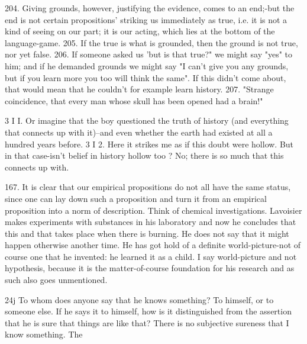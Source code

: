 204. Giving grounds, however, justifying the evidence, comes
to an end;-but the end is not certain propositions' striking us
immediately as true, i.e. it is not a kind of seeing on our part;
it is our acting, which lies at the bottom of the language-game.
205. If the true is what is grounded, then the ground is not
true, nor yet false.
206. If someone asked us 'but is that true?" we might say "yes"
to him; and if he demanded grounds we might say "I can't give
you any grounds, but if you learn more you too will think the
same".
If this didn't come about, that would mean that he couldn't
for example learn history.
207. "Strange coincidence, that every man whose skull has
been opened had a brain!"


3 I I. Or imagine that the boy questioned the truth of history
(and everything that connects up with it)--and even whether the
earth had existed at all a hundred years before.
3 I 2. Here it strikes me as if this doubt were hollow. But in that
case-isn't belief in history hollow too ? No; there is so much that
this connects up with.


167. It is clear that our empirical propositions do not all have
the same status, since one can lay down such a proposition and
turn it from an empirical proposition into a norm of description.
Think of chemical investigations. Lavoisier makes experiments
with substances in his laboratory and now he concludes that this
and that takes place when there is burning. He does not say that
it might happen otherwise another time. He has got hold of a
definite world-picture-not of course one that he invented:
he learned it as a child. I say world-picture and not hypothesis,
because it is the matter-of-course foundation for his research and
as such also goes unmentioned.


24j To whom does anyone say that he knows something? To
himself, or to someone else. If he says it to himself, how is it
distinguished from the assertion that he is sure that things are like
that? There is no subjective sureness that I know something. The


